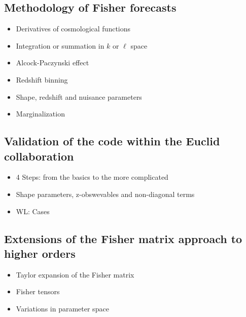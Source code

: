 \subsection{Methodology of Fisher forecasts}
\begin{itemize}
\item Derivatives of cosmological functions
\item Integration or summation in $k$ or $\ell$ space
\item Alcock-Paczynski effect
\item Redshift binning 
\item Shape, redshift and nuisance parameters
\item Marginalization
\end{itemize}

\subsection{Validation of the code within the Euclid collaboration}
\begin{itemize}
\item 4 Steps: from the basics to the more complicated
\item Shape parameters, z-obswevables and non-diagonal terms
\item WL: Cases
\end{itemize}

\subsection{Extensions of the Fisher matrix approach to higher orders}
\begin{itemize}
\item Taylor expansion of the Fisher matrix
\item Fisher tensors
\item Variations in parameter space
\end{itemize}






